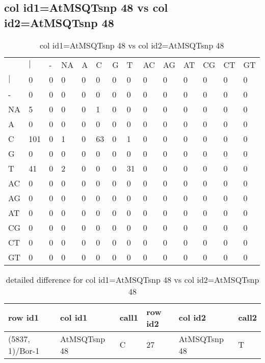 \subsection{col id1=AtMSQTsnp 48 vs col id2=AtMSQTsnp 48}
\begin{center}
\begin{longtable}{|l|l|l|l|l|l|l|l|l|l|l|l|l|l|}
\caption{col id1=AtMSQTsnp 48 vs col id2=AtMSQTsnp 48} \label{table_dm744}\\
\hline
\\
\hline
&$|$&-&NA&A&C&G&T&AC&AG&AT&CG&CT&GT\\
$|$&0&0&0&0&0&0&0&0&0&0&0&0&0\\
-&0&0&0&0&0&0&0&0&0&0&0&0&0\\
NA&5&0&0&0&1&0&0&0&0&0&0&0&0\\
A&0&0&0&0&0&0&0&0&0&0&0&0&0\\
C&101&0&1&0&63&0&1&0&0&0&0&0&0\\
G&0&0&0&0&0&0&0&0&0&0&0&0&0\\
T&41&0&2&0&0&0&31&0&0&0&0&0&0\\
AC&0&0&0&0&0&0&0&0&0&0&0&0&0\\
AG&0&0&0&0&0&0&0&0&0&0&0&0&0\\
AT&0&0&0&0&0&0&0&0&0&0&0&0&0\\
CG&0&0&0&0&0&0&0&0&0&0&0&0&0\\
CT&0&0&0&0&0&0&0&0&0&0&0&0&0\\
GT&0&0&0&0&0&0&0&0&0&0&0&0&0\\
\hline
\end{longtable}
\end{center}

\begin{center}
\begin{longtable}{|l|l|l|l|l|l|}
\caption{detailed difference for col id1=AtMSQTsnp 48 vs col id2=AtMSQTsnp 48} \label{table_dm745}\\
\hline
row id1&col id1&call1&row id2&col id2&call2\\
\hline
(5837, 1)/Bor-1&AtMSQTsnp 48&C&27&AtMSQTsnp 48&T\\
\hline
\end{longtable}
\end{center}

